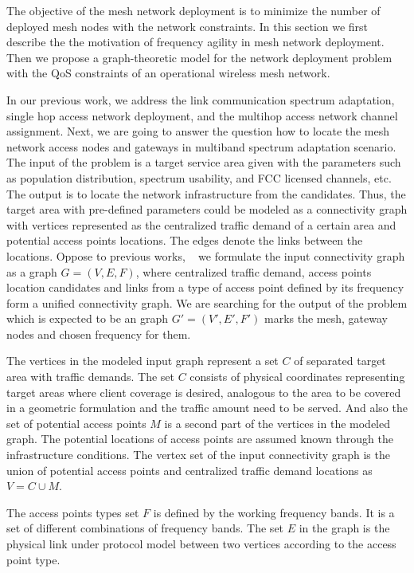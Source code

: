 
The objective of the mesh network deployment is to minimize the number of 
deployed mesh nodes with the network constraints. In this section we first 
describe the the motivation of frequency agility in mesh network deployment. 
Then we propose a graph-theoretic model for the network deployment problem
with the QoS constraints of an operational wireless mesh network.

In our previous work, we address the link communication spectrum adaptation, 
single hop access network deployment, and the multihop access network channel
assignment. Next, we are going to answer the question how to locate the mesh
network access nodes and gateways in multiband spectrum adaptation scenario.
The input of the problem is a target service area given with the parameters 
such as population distribution, spectrum usability, and FCC licensed channels, 
etc. The output is to locate the network infrastructure from the candidates.
Thus, the target area with pre-defined parameters could be modeled as a 
connectivity graph with vertices represented as the centralized traffic demand 
of a certain area and potential access points locations. The edges denote the 
links between the locations. Oppose to previous works,
~\cite{robinson2010deploying,franklin2007node,tang2005interference,irwin2013resource}
we formulate the input connectivity graph as a graph $G = (V,E,F)$, where centralized
traffic demand, access points location candidates and links from a type of access 
point defined by its frequency form a unified connectivity graph. 
We are searching for the output of the problem which is expected to be an graph 
$G' = (V',E',F')$ marks the mesh, gateway nodes and chosen frequency for them. 

The vertices in the modeled input graph represent a set $C$ of  separated target 
area with traffic demands. The set $C$ consists of physical coordinates representing 
target areas where client coverage is desired, analogous to the area to be covered 
in a geometric formulation and the traffic amount need to be served. And also the 
set of potential access points $M$ is a second part of the vertices in the modeled 
graph. The potential locations of access points are assumed known through the 
infrastructure conditions. The vertex set of the input connectivity graph is 
the union of potential access points and centralized traffic demand locations as 
$V = C\cup M$.

The access points types set $F$ is defined by the working frequency bands. It is 
a set of different combinations of frequency bands. The set $E$ in the graph is the 
physical link under protocol model between two vertices according to the access 
point type.

